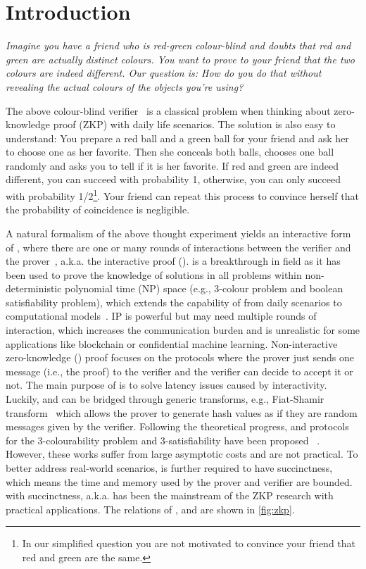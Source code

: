 \documentclass[letterpaper,twocolumn,10pt]{article}
\theoremstyle{definition}
\newcommand{\ZK}{\text{zk-SNARK}\xspace}
\newcommand{\IP}{\text{IP}\xspace}
\newcommand{\new}[1]{{#1}\xspace}
\newcommand{\ZKP}{\text{ZKP}\xspace}
\newcommand{\NIZK}{\text{NIZK}\xspace}
\begin{document}
\section{Introduction}

\new{
	{\textit{Imagine you have a friend who is red-green colour-blind and doubts that red and green are actually distinct colours. You want to prove to your friend that the two colours are indeed different. Our question is: How do you do that without revealing the actual colours of the objects you're using?}
	}
}

\new{The above colour-blind verifier~\cite{colorblind} is a classical problem when thinking about zero-knowledge proof (ZKP) with daily life scenarios. The solution is also easy to understand: 
	You prepare a red ball and a green ball for your friend and ask her to choose one as her favorite. Then she conceals both balls, chooses one ball randomly and asks you to tell if it is her favorite. If red and green are indeed different, you can succeed with probability 1, otherwise, you can only succeed with probability 1/2\footnote{\new{In our simplified question you are not motivated to convince your friend that red and green are the same.}}. Your friend can repeat this process to convince herself that the probability of coincidence is negligible.
}

\new{
	A natural formalism of the above thought experiment yields an interactive form of \ZKP, where there are one or many rounds of interactions between the verifier and the prover~\cite{goldreich1998complexity}, a.k.a. the interactive proof (\IP). \IP is a breakthrough in \ZKP field as it has been used to prove the knowledge of solutions in all problems within non-deterministic polynomial time (NP) space (e.g., 3-colour problem and boolean satisfiability problem), which extends the capability of \ZKP from daily scenarios to computational models~\cite{arora1998proof}. IP is powerful but may need multiple rounds of interaction, which increases the communication burden and is unrealistic for some applications like blockchain or confidential machine learning. Non-interactive zero-knowledge (\NIZK) proof focuses on the protocols where the prover just sends one message (i.e., the proof) to the verifier and the verifier can decide to accept it or not. The main purpose of \NIZK is to solve latency issues caused by interactivity. Luckily, \IP and \NIZK can be bridged through generic transforms, e.g., Fiat-Shamir transform~\cite{fiat1986prove} which allows the prover to generate hash values as if they are random messages given by the verifier. Following the theoretical progress, \IP and \NIZK protocols for the 3-colourability problem and 3-satisfiability have been proposed ~\cite{arora1998proof,arora1998probabilistic}. However, these works suffer from large asymptotic costs and are not practical. To better address real-world scenarios, \NIZK is further required to have succinctness, which means the time and memory used by the prover and verifier are bounded. \NIZK with succinctness, a.k.a. \ZK has been the mainstream of the ZKP research with practical applications. The relations of \ZKP, \NIZK and \ZK are shown in} \autoref{fig:zkp}.
\end{document}
